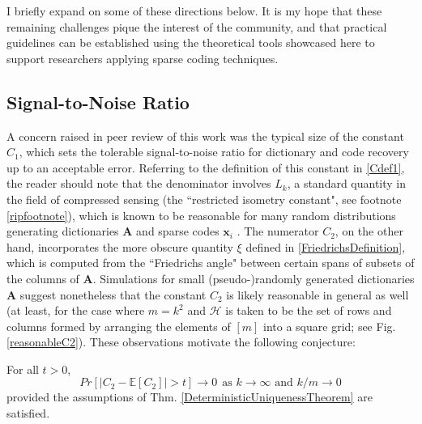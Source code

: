 

I briefly expand on some of these directions below. It is my hope that these remaining challenges pique the interest of the community, and that practical guidelines can be established using the theoretical tools showcased here to support researchers applying sparse coding techniques. 


\subsection{Signal-to-Noise Ratio}

A concern raised in peer review of this work was the typical size of the constant $C_1$, which sets the tolerable signal-to-noise ratio for dictionary and code recovery up to an acceptable error. Referring to the definition of this constant in \eqref{Cdef1}, the reader should note that the denominator involves $L_k$, a standard quantity in the field of compressed sensing (the ``restricted isometry constant", see footnote \ref{ripfootnote}), which is known to be reasonable for many random distributions generating dictionaries $\mathbf{A}$ and sparse codes $\mathbf{x}_i$ \cite{baraniuk2008simple}. The numerator $C_2$, on the other hand, incorporates the more obscure quantity $\xi$ defined in \eqref{FriedrichsDefinition}, which is computed from the ``Friedrichs angle" between certain spans of subsets of the columns of $\mathbf{A}$. Simulations for small (pseudo-)randomly generated dictionaries $\mathbf{A}$ suggest nonetheless that the constant $C_2$ is likely reasonable in general as well (at least, for the case where $m=k^2$ and $\mathcal{H}$ is taken to be the set of rows and columns formed by arranging the elements of $[m]$ into a square grid; see Fig. \ref{reasonableC2}). These observations motivate the following conjecture:

\begin{conjecture}
For all $t > 0$,
\begin{equation*}
Pr[ \left| C_2- \mathbb{E}[C_2 ] \right| > t] \to 0 \ \ \text{as $k \to \infty$ and $k/m \to 0$} 
\end{equation*}
provided the assumptions of Thm. \ref{DeterministicUniquenessTheorem} are satisfied.
\end{conjecture}

